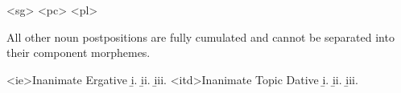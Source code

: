 	\a<sg>  
	\a<pc>  
	\a<pl>  
\xe

All other noun postpositions are fully cumulated and cannot be separated into their component morphemes.

	\a<ie>Inanimate Ergative
	\beginsubsub
		\b{i.}  
		\b{ii.}  
		\b{iii.}  
	\endsubsub
	\a<itd>Inanimate Topic Dative
	\beginsubsub
		\b{i.}  
		\b{ii.}  
		\b{iii.}  
	\endsubsub
\xe


